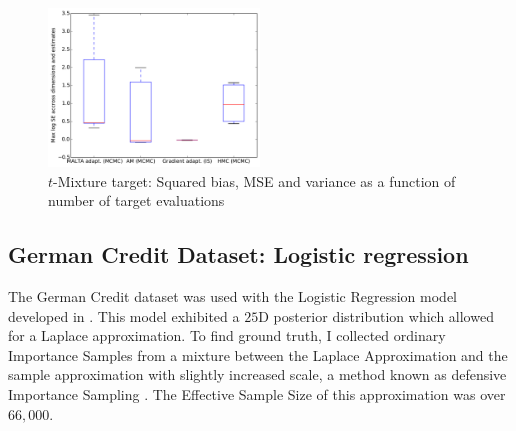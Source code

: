\begin{figure}[tbp]
\begin{center}
\includegraphics[width=0.5\textwidth]{figures/T_Mixture_worst.pdf}
\caption{$t$-Mixture target: Squared bias, MSE and variance as a function of number of target evaluations}
\label{fig:t_mixt_mse}
\end{center}
\end{figure}


\subsection{German Credit Dataset: Logistic regression}
The German Credit dataset was used with the Logistic Regression model developed in \cite{Hoffman2014}. This model exhibited a $25$D posterior distribution which allowed for a Laplace approximation. To find ground truth, I collected ordinary Importance Samples from a mixture between the Laplace Approximation and the sample approximation with slightly increased scale, a method known as defensive Importance Sampling \citep{Owen2000}. The Effective Sample Size of this approximation was over $66,000$. 


